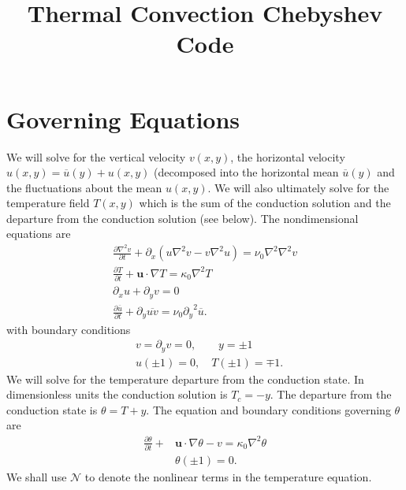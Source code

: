 \documentclass[12pt]{article}
\title{Thermal Convection Chebyshev Code}
\newcommand{\lapl}{\nabla^{2}}
\newcommand{\lr}[1]{\left(#1\right)}
\newcommand{\ua}{\overline{u}}
\begin{document}
  \maketitle

  \section{Governing Equations}
    We will solve for the vertical velocity $v\lr{x,y}$, the horizontal velocity $u\lr{x,y} = \ua\lr{y} + u\lr{x,y}$ 
    (decomposed into the horizontal mean $\ua\lr{y}$ and the fluctuations about the mean $u\lr{x,y}$.  We will 
    also ultimately solve for the temperature field $T\lr{x,y}$ which is the sum of the conduction solution and 
    the departure from the conduction solution (see below).  The nondimensional equations are 
    \begin{align}
      \frac{\partial \lapl v}{\partial t} + \partial_{x}\lr{u\lapl v - v\lapl u} = \nu_{0}\lapl\lapl v \\
      \frac{\partial T}{\partial t} + \mathbf{u}\cdot\nabla T = \kappa_{0}\lapl T \\
      \partial_{x}u + \partial_{y}v = 0 \\
      \frac{\partial \ua}{\partial t} + \partial_{y} \overline{uv} = \nu_{0} {\partial_{y}}^{2}  \ua \label{eq:meanflow}.
    \end{align}
    with boundary conditions 
    \begin{align}
      &v = \partial_{y} v = 0, \qquad y = \pm 1 \\
      &u\lr{\pm 1} = 0, \quad T\lr{\pm 1} = \mp 1.
    \end{align}
    We will solve for the temperature departure from the conduction state.  In dimensionless units 
    the conduction solution is $T_{c} = -y$.  The departure from the conduction state is 
    $\theta = T + y$.  The equation and boundary conditions governing $\theta$ are 
    \begin{align}
      \frac{\partial \theta}{\partial t} + &\mathbf{u}\cdot\nabla\theta - v = \kappa_{0}\lapl\theta \\
      &\theta\lr{\pm 1} = 0.
    \end{align}
    We shall use $\mathcal{N}$ to denote the nonlinear terms in the temperature equation.
\end{document}
